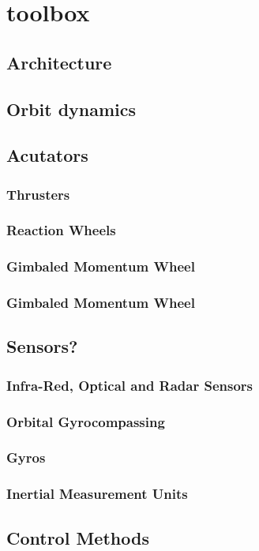 \section{\acf{toolbox}}
\subsection{Architecture}
\subsection{Orbit dynamics}
\subsection{Acutators}
\subsubsection{Thrusters}
\subsubsection{Reaction Wheels}
\subsubsection{Gimbaled Momentum Wheel}
\subsubsection{Gimbaled Momentum Wheel}
\subsection{Sensors?}
\subsubsection{Infra-Red, Optical and Radar Sensors}
\subsubsection{Orbital Gyrocompassing}
\subsubsection{Gyros}
\subsubsection{Inertial Measurement Units}
\subsection{Control Methods}
